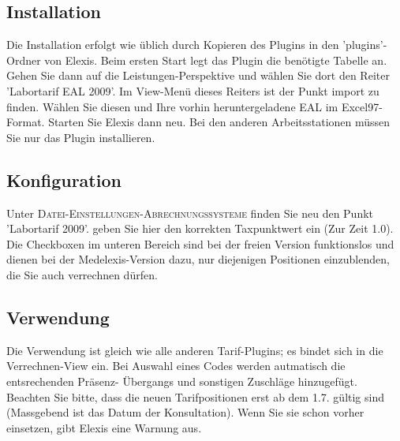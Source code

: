 \documentclass[a4paper]{scrartcl}
\begin{document}
 
 
\subsection{Installation}
Die Installation erfolgt wie üblich durch Kopieren des Plugins in den 'plugins'-Ordner von Elexis. Beim ersten Start legt das Plugin die benötigte Tabelle an. Gehen Sie dann auf die Leistungen-Perspektive und wählen Sie dort den Reiter 'Labortarif EAL 2009'. Im View-Menü dieses Reiters ist der Punkt import zu finden. Wählen Sie diesen und Ihre vorhin heruntergeladene EAL im Excel97-Format. Starten Sie Elexis dann neu. Bei den anderen Arbeitsstationen müssen Sie nur das Plugin installieren.

\subsection{Konfiguration}
Unter \textsc{Datei-Einstellungen-Abrechnungssysteme} finden Sie neu den Punkt 'Labortarif 2009'. geben Sie hier den korrekten Taxpunktwert ein (Zur Zeit 1.0). Die Checkboxen im unteren Bereich sind bei der freien Version funktionslos und dienen bei der Medelexis-Version dazu, nur diejenigen Positionen einzublenden, die Sie auch verrechnen dürfen.

\subsection{Verwendung}
Die Verwendung ist gleich wie alle anderen Tarif-Plugins; es bindet sich in die Verrechnen-View ein. Bei Auswahl eines Codes werden autmatisch die entsrechenden Präsenz- Übergangs und sonstigen Zuschläge hinzugefügt.
Beachten Sie bitte, dass die neuen Tarifpositionen erst ab dem 1.7. gültig sind (Massgebend ist das Datum der Konsultation). Wenn Sie sie schon vorher einsetzen, gibt Elexis eine Warnung aus.
\end{document}
